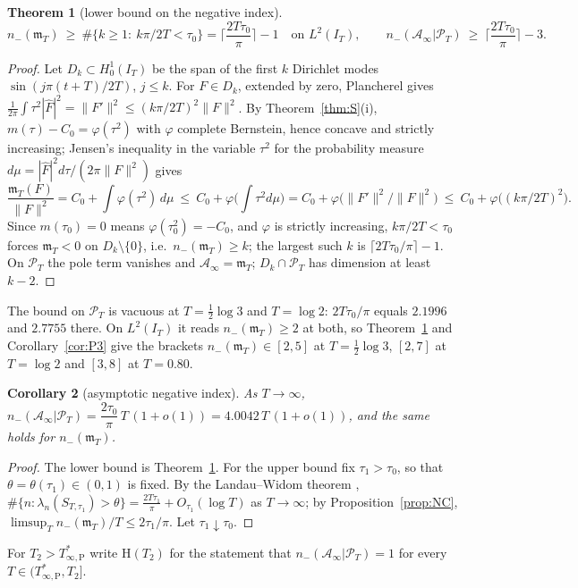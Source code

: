 \documentclass[11pt]{amsart}
\newtheorem{theorem}{Theorem}[section]
\newtheorem{corollary}[theorem]{Corollary}
\theoremstyle{definition}
\theoremstyle{remark}
\newcommand{\PT}{\mathcal P_T}
\newcommand{\IT}{I_T}
\newcommand{\Fh}{\widehat F}
\newcommand{\Ainf}{\mathcal A_\infty}
\newcommand{\mT}{\mathfrak m_T}
\begin{document}
\begin{theorem}[lower bound on the negative index]\label{thm:J}
\[
n_-(\mT)\ \ge\ \#\{k\ge1:\ k\pi/2T<\tau_0\}=\Big\lceil\frac{2T\tau_0}{\pi}\Big\rceil-1
\quad\text{on }L^2(\IT),\qquad
n_-(\Ainf|\PT)\ \ge\ \Big\lceil\frac{2T\tau_0}{\pi}\Big\rceil-3 .
\]
\end{theorem}
\begin{proof}
Let $D_k\subset H^1_0(\IT)$ be the span of the first $k$ Dirichlet modes $\sin(j\pi(t+T)/2T)$,
$j\le k$. For $F\in D_k$, extended by zero, Plancherel gives
$\frac1{2\pi}\int\tau^2|\Fh|^2=\|F'\|^2\le(k\pi/2T)^2\|F\|^2$. By Theorem~\ref{thm:S}(i),
$m(\tau)-C_0=\varphi(\tau^2)$ with $\varphi$ complete Bernstein, hence concave and strictly
increasing; Jensen's inequality in the variable $\tau^2$ for the probability measure
$d\mu=|\Fh|^2d\tau/(2\pi\|F\|^2)$ gives
\[
\frac{\mT(F)}{\|F\|^2}=C_0+\int\varphi(\tau^2)\,d\mu\ \le\ C_0+\varphi\Big(\int\tau^2d\mu\Big)
=C_0+\varphi\big(\|F'\|^2/\|F\|^2\big)\ \le\ C_0+\varphi\big((k\pi/2T)^2\big).
\]
Since $m(\tau_0)=0$ means $\varphi(\tau_0^2)=-C_0$, and $\varphi$ is strictly increasing,
$k\pi/2T<\tau_0$ forces $\mT<0$ on $D_k\setminus\{0\}$, i.e.\ $n_-(\mT)\ge k$; the
largest such $k$ is $\lceil2T\tau_0/\pi\rceil-1$. On $\PT$ the pole term vanishes and
$\Ainf=\mT$; $D_k\cap\PT$ has dimension at least $k-2$.
\end{proof}
The bound on $\PT$ is vacuous at $T=\frac12\log3$ and $T=\log2$: $2T\tau_0/\pi$ equals $2.1996$ and
$2.7755$ there. On $L^2(\IT)$ it reads $n_-(\mT)\ge2$ at both, so Theorem~\ref{thm:J} and
Corollary~\ref{cor:P3} give the brackets $n_-(\mT)\in[2,5]$ at $T=\frac12\log3$, $[2,7]$ at $T=\log2$ and
$[3,8]$ at $T=0.80$.

\begin{corollary}[asymptotic negative index]\label{cor:nasym}
As $T\to\infty$, $n_-(\Ainf|\PT)=\dfrac{2\tau_0}{\pi}\,T\,(1+o(1))=4.0042\,T\,(1+o(1))$, and the same holds for $n_-(\mT)$.
\end{corollary}
\begin{proof}
The lower bound is Theorem~\ref{thm:J}. For the upper bound fix $\tau_1>\tau_0$, so that
$\theta=\theta(\tau_1)\in(0,1)$ is fixed. By the Landau--Widom theorem \cite{LandauWidom1980},
$\#\{n:\lambda_n(S_{T,\tau_1})>\theta\}=\frac{2T\tau_1}\pi+O_{\tau_1}(\log T)$ as $T\to\infty$; by
Proposition~\ref{prop:NC}, $\limsup_T n_-(\mT)/T\le2\tau_1/\pi$. Let $\tau_1\downarrow\tau_0$.
\end{proof}

For $T_2>T^*_{\infty,\mathrm P}$ write $\mathrm H(T_2)$ for the statement that
$n_-(\Ainf|\PT)=1$ for every $T\in(T^*_{\infty,\mathrm P},T_2]$.
\end{document}

